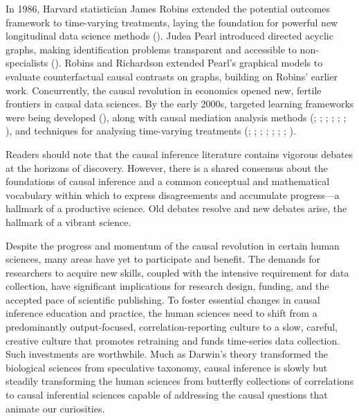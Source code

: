 \documentclass[
  single column]{article}
\begin{document}
In 1986, Harvard statistician James Robins extended the potential
outcomes framework to time-varying treatments, laying the foundation for
powerful new longitudinal data science methods
(). Judea Pearl introduced
directed acyclic graphs, making identification problems transparent and
accessible to non-specialists ().
Robins and Richardson extended Pearl's graphical models to evaluate
counterfactual causal contrasts on graphs, building on Robins' earlier
work. Concurrently, the causal revolution in economics opened new,
fertile frontiers in causal data sciences. By the early 2000s, targeted
learning frameworks were being developed
(), along with
causal mediation analysis methods (; ;
;
;
;
;
), and
techniques for analysing time-varying treatments
(;
;
;
;
;
;
;
).

Readers should note that the causal inference literature contains
vigorous debates at the horizons of discovery. However, there is a
shared consensus about the foundations of causal inference and a common
conceptual and mathematical vocabulary within which to express
disagreements and accumulate progress---a hallmark of a productive
science. Old debates resolve and new debates arise, the hallmark of a
vibrant science.

Despite the progress and momentum of the causal revolution in certain
human sciences, many areas have yet to participate and benefit. The
demands for researchers to acquire new skills, coupled with the
intensive requirement for data collection, have significant implications
for research design, funding, and the accepted pace of scientific
publishing. To foster essential changes in causal inference education
and practice, the human sciences need to shift from a predominantly
output-focused, correlation-reporting culture to a slow, careful,
creative culture that promotes retraining and funds time-series data
collection. Such investments are worthwhile. Much as Darwin's theory
transformed the biological sciences from speculative taxonomy, causal
inference is slowly but steadily transforming the human sciences from
butterfly collections of correlations to causal inferential sciences
capable of addressing the causal questions that animate our curiosities.
\end{document}
